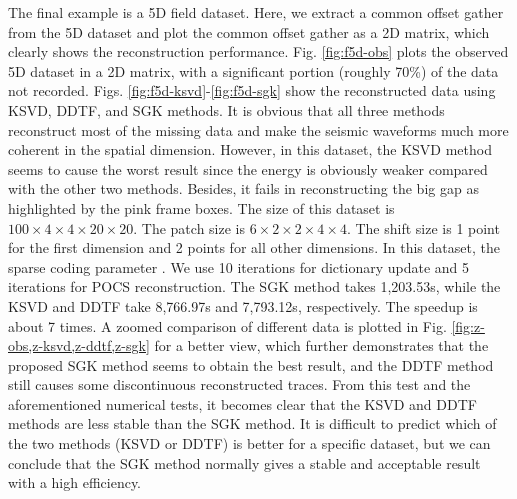 The final example is a 5D field dataset.  Here, we extract a common offset gather from the 5D dataset and plot the common offset gather as a 2D matrix, which clearly shows the reconstruction performance. Fig. \ref{fig:f5d-obs} plots the observed 5D dataset in a 2D matrix, with a significant portion (roughly 70\%) of the data not recorded. Figs. \ref{fig:f5d-ksvd}-\ref{fig:f5d-sgk} show the reconstructed data using KSVD, DDTF, and SGK methods.  It is obvious that all three methods reconstruct most of the missing data and make the seismic waveforms much more coherent in the spatial dimension. However, in this dataset, the KSVD method seems to cause the worst result since the energy is obviously weaker compared with the other two methods. Besides, it fails in reconstructing the big gap as highlighted by the pink frame boxes. The size of this dataset is $100\times 4\times 4\times 20\times 20$. The patch size is $6\times 2 \times 2\times 4\times 4$. The shift size is 1 point for the first dimension and 2 points for all other dimensions. In this dataset, the sparse coding parameter . We use 10 iterations for dictionary update and 5 iterations for POCS reconstruction. The SGK method takes 1,203.53s, while the KSVD and DDTF take 8,766.97s and 7,793.12s, respectively. The speedup is about 7 times.  A zoomed comparison of different data is plotted in Fig. \ref{fig:z-obs,z-ksvd,z-ddtf,z-sgk} for a better view, which further demonstrates that the proposed SGK method seems to obtain the best result, and the DDTF method still causes some discontinuous reconstructed traces. From this test and the aforementioned numerical tests, it becomes clear that the KSVD and DDTF methods are less stable than the SGK method. It is difficult to predict which of the two methods (KSVD or DDTF) is better for a specific dataset, but we can conclude that the SGK method normally gives a stable and acceptable result with a high efficiency. 
